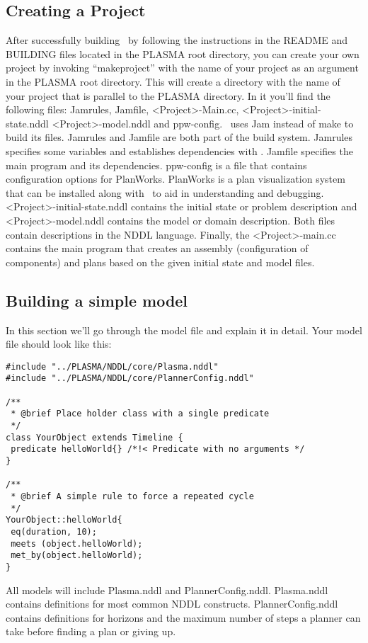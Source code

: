\documentclass[10pt, letterpaper, twoside]{article}
\begin{document}
\subsection{Creating a Project}
\label{project}
After successfully building \ET\, by following the instructions in the
README and BUILDING files located in the PLASMA root directory, you can
create your own project by invoking ``makeproject'' with the name of your
project as an argument in the PLASMA root directory.  This will create a
directory with the name of your project that is parallel to the PLASMA
directory.  In it you'll find the following files: Jamrules, Jamfile,
<Project>-Main.cc, <Project>-initial-state.nddl <Project>-model.nddl and
ppw-config.  \ET\, uses Jam instead of make to build its files.  Jamrules
and Jamfile are both part of the build system.  Jamrules specifies some
variables and establishes dependencies with \ET.  Jamfile specifies the
main program and its dependencies.  ppw-config is a file that contains
configuration options for PlanWorks.  PlanWorks is a plan visualization
system that can be installed along with \ET\, to aid in understanding and
debugging.  <Project>-initial-state.nddl contains the initial state or
problem description and <Project>-model.nddl contains the model or domain
description. Both files contain descriptions in the NDDL language.
Finally, the <Project>-main.cc contains the main program that creates an
assembly (configuration of \ET\, components) and plans based on the given
initial state and model files.

\subsection{Building a simple model}
\label{building}
In this section we'll go through the model file and explain it in detail.
Your model file should look like this:

\begin{verbatim}
#include "../PLASMA/NDDL/core/Plasma.nddl"
#include "../PLASMA/NDDL/core/PlannerConfig.nddl"

/**
 * @brief Place holder class with a single predicate
 */
class YourObject extends Timeline {
 predicate helloWorld{} /*!< Predicate with no arguments */
}

/**
 * @brief A simple rule to force a repeated cycle
 */
YourObject::helloWorld{
 eq(duration, 10);
 meets (object.helloWorld);
 met_by(object.helloWorld);
}
\end{verbatim}

All models will include Plasma.nddl and PlannerConfig.nddl.  Plasma.nddl
contains definitions for most common NDDL constructs.  PlannerConfig.nddl
contains definitions for horizons and the maximum number of steps a planner
can take before finding a plan or giving up.
\end{document}
